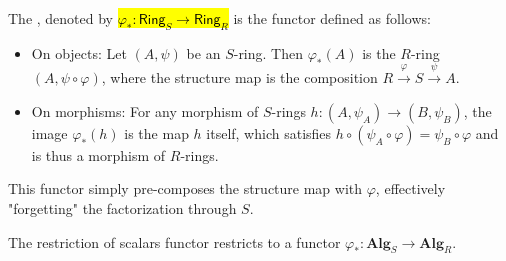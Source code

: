\begin{definition}
\begin{enumerate}
        The , denoted by
        \hl{$ \varphi_*: \mathsf{Ring}_S \to \mathsf{Ring}_R $}
        is the functor defined as follows:
        \begin{itemize}
            \item On objects: Let $(A, \psi)$ be an $S$-ring. Then $\varphi_*(A)$ is the $R$-ring $(A, \psi \circ \varphi)$, where the structure map is the composition $R \xrightarrow{\varphi} S \xrightarrow{\psi} A$.
            \item On morphisms: For any morphism of $S$-rings $h: (A, \psi_A) \to (B, \psi_B)$, the image $\varphi_*(h)$ is the map $h$ itself, which satisfies $h \circ (\psi_A \circ \varphi) = \psi_B \circ \varphi$ and is thus a morphism of $R$-rings.
        \end{itemize}
        This functor simply pre-composes the structure map with $\varphi$, effectively "forgetting" the factorization through $S$.

        The restriction of scalars functor restricts to a functor $\varphi_*: \mathbf{Alg}_S \to \mathbf{Alg}_R$. 

\end{enumerate}
\end{definition}